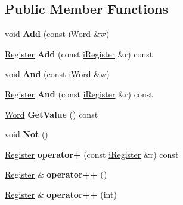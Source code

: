 \subsection*{Public Member Functions}
\begin{DoxyCompactItemize}
\item 
\hypertarget{classRegister_a73d8564754d7ddb7e8349001010e688b}{
void {\bfseries Add} (const \hyperlink{classiWord}{iWord} \&w)}
\label{classRegister_a73d8564754d7ddb7e8349001010e688b}

\item 
\hypertarget{classRegister_a9d9c6801db55e8706eb242b1e0e0fa3f}{
\hyperlink{classRegister}{Register} {\bfseries Add} (const \hyperlink{classiRegister}{iRegister} \&r) const }
\label{classRegister_a9d9c6801db55e8706eb242b1e0e0fa3f}

\item 
\hypertarget{classRegister_a312263efb06ef459409879f5119b3b81}{
void {\bfseries And} (const \hyperlink{classiWord}{iWord} \&w)}
\label{classRegister_a312263efb06ef459409879f5119b3b81}

\item 
\hypertarget{classRegister_af3502239502c214b8c9362a6fd9f8ff8}{
\hyperlink{classRegister}{Register} {\bfseries And} (const \hyperlink{classiRegister}{iRegister} \&r) const }
\label{classRegister_af3502239502c214b8c9362a6fd9f8ff8}

\item 
\hypertarget{classRegister_a379734c28ab8258ce528a96de24cfa1a}{
\hyperlink{classWord}{Word} {\bfseries GetValue} () const }
\label{classRegister_a379734c28ab8258ce528a96de24cfa1a}

\item 
\hypertarget{classRegister_abbf5f6793328db8b28845cac84c0e82d}{
void {\bfseries Not} ()}
\label{classRegister_abbf5f6793328db8b28845cac84c0e82d}

\item 
\hypertarget{classRegister_a55de0c3b5f8fe14df7c24bce777204e0}{
\hyperlink{classRegister}{Register} {\bfseries operator+} (const \hyperlink{classiRegister}{iRegister} \&r) const }
\label{classRegister_a55de0c3b5f8fe14df7c24bce777204e0}

\item 
\hypertarget{classRegister_ac4e78cff131bc5c69695a9db5ca35255}{
\hyperlink{classRegister}{Register} \& {\bfseries operator++} ()}
\label{classRegister_ac4e78cff131bc5c69695a9db5ca35255}

\item 
\hypertarget{classRegister_ae3414befdccf70a18df0f67dc19d86b7}{
\hyperlink{classRegister}{Register} \& {\bfseries operator++} (int)}
\label{classRegister_ae3414befdccf70a18df0f67dc19d86b7}


\end{DoxyCompactItemize}
